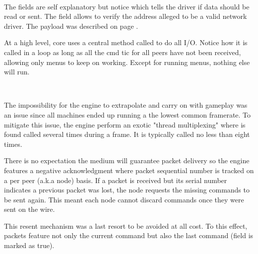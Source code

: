  \label{doomcom_t.c} \\
\par
\vspace{-10pt}
The fields are self explanatory but notice  which tells the driver if data should be read or sent. The  field allows \doom{} to verify the address alleged to be a valid network driver. The  payload was described on page \pageref{cmd_t_type}.



At a high level, \doom{} core uses a central method called  to do all I/O. Notice how it is called in a loop as long as all the cmd tic for all peers have not been received, allowing only menus to keep on working. Except for running menus, nothing else will run.\\
\par
{}\\
\par
The impossibility for the engine to extrapolate and carry on with gameplay was an issue since all machines ended up running a the lowest common framerate. To mitigate this issue, the engine perform an exotic "thread multiplexing" where  is found called several times during a frame. It is typically called no less than eight times.\\
\par
{}



There is no expectation the medium will guarantee packet delivery so the engine features a negative acknowledgment where packet sequential number is tracked on a per peer (a.k.a node) basis. If a packet is received but its serial number indicates a previous packet was lost, the node requests the missing commands to be sent again. This meant each node cannot discard commands once they were sent on the wire.\\
\par
This resent mechanism was a last resort to be avoided at all cost. To this effect, packets feature not only the current command but also the last command (field  is marked as true).\\





